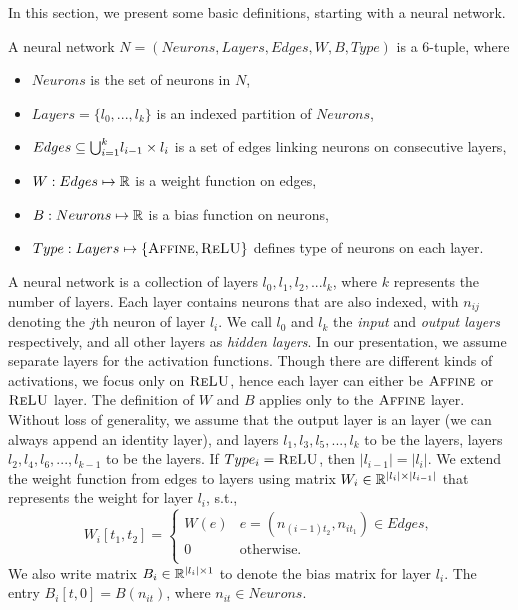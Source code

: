 In this section, we present some basic definitions, starting with a neural network.
\begin{df}
  \label{def:net}
    A neural network $N = (Neurons, Layers, Edges, W, B, Type)$ is a 6-tuple, where
    \begin{itemize}
        \item $Neurons$ is the set of neurons in $N$,
        \item $Layers = \{l_0,...,l_k\}$ is an indexed partition of $Neurons$,
        \item $ Edges \subseteq {\bigcup}_{i=1}^{k} l_{i-1} \times l_{i}$ is a set of edges linking neurons on consecutive layers,
        \item $W : Edges \mapsto \mathbb{R}$ is a weight function on edges,
        \item $B : Neurons \mapsto \mathbb{R}$ is a bias function on neurons,
        \item $Type : Layers \mapsto \{\textsc{Affine}{}, \textsc{ReLU}{}\}$ defines type of neurons on each layer.
    \end{itemize}
\end{df}

A neural network is a collection of layers $l_0, l_1, l_2, ... l_k$, where $k$ represents the number of layers. Each layer contains neurons that are also indexed, with $n_{ij}$ denoting the $j$th neuron of layer $l_i$. We call $l_0$ and $l_k$ the {\em input} and {\em output layers} respectively, and all other layers as {\em hidden layers}. In our presentation, we assume separate layers for the activation functions. Though there are different kinds of activations, we focus only on $\textsc{ReLU}${}, hence each layer can either be  $\textsc{Affine}${} or $\textsc{ReLU}${} layer. The definition of $W$ and $B$ applies only to the $\textsc{Affine}${} layer. Without loss of generality, we assume that the output layer is an \affine{} layer (we can always append an identity \affine{} layer), and layers $l_1, l_3, l_5, ..., l_k$ to be the \affine{} layers, layers $l_2, l_4, l_6, ..., l_{k-1}$ to be the \relu{} layers. If $Type_i = \textsc{ReLU}{}$, then $|l_{i-1}| = |l_{i}|$. We extend the weight function from edges to layers using matrix $W_i \in \mathbb{R}^{|l_i|\times|l_{i-1}|}$ that represents the weight for layer $l_i$, s.t.,
$$
W_i[t_1, t_2] = 
\begin{cases}
  W(e) & e=(n_{(i-1)t_2}, n_{it_1}) \in Edges,\\
  0 & \text{otherwise.}\\
\end{cases}
$$
We also write matrix $B_i \in \mathbb{R}^{|l_i|\times 1}$ to denote the bias matrix for layer $l_i$. The entry $B_i[t,0] = B(n_{it})$, where $n_{it} \in Neurons$. 

